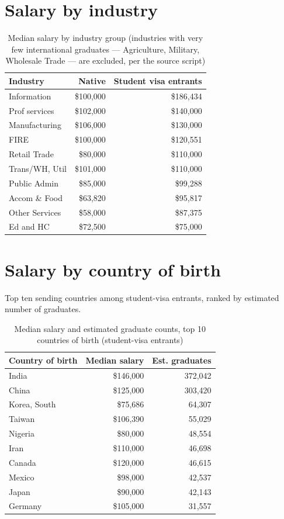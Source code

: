 \documentclass[11pt]{article}
\begin{document}
\section{Salary by industry}
\begin{table}[H]
\centering
\caption{Median salary by industry group (industries with very few international graduates --- Agriculture, Military, Wholesale Trade --- are excluded, per the source script)}

\begin{tabular}{lrr}
\toprule
Industry & Native & Student visa entrants\\
\midrule
Information & \$100,000 & \$186,434\\
Prof services & \$102,000 & \$140,000\\
Manufacturing & \$106,000 & \$130,000\\
FIRE & \$100,000 & \$120,551\\
Retail Trade & \$80,000 & \$110,000\\
Trans/WH, Util & \$101,000 & \$110,000\\
Public Admin & \$85,000 & \$99,288\\
Accom \& Food & \$63,820 & \$95,817\\
Other Services & \$58,000 & \$87,375\\
Ed and HC & \$72,500 & \$75,000\\
\bottomrule
\end{tabular}
\end{table}
\section{Salary by country of birth}
Top ten sending countries among student-visa entrants, ranked by estimated number of graduates.
\begin{table}[H]
\centering
\caption{Median salary and estimated graduate counts, top 10 countries of birth (student-visa entrants)}

\begin{tabular}{lrr}
\toprule
Country of birth & Median salary & Est. graduates\\
\midrule
India & \$146,000 & 372,042\\
China & \$125,000 & 303,420\\
Korea, South & \$75,686 & 64,307\\
Taiwan & \$106,390 & 55,029\\
Nigeria & \$80,000 & 48,554\\
Iran & \$110,000 & 46,698\\
Canada & \$120,000 & 46,615\\
Mexico & \$98,000 & 42,537\\
Japan & \$90,000 & 42,143\\
Germany & \$105,000 & 31,557\\
\bottomrule
\end{tabular}
\end{table}
\end{document}
